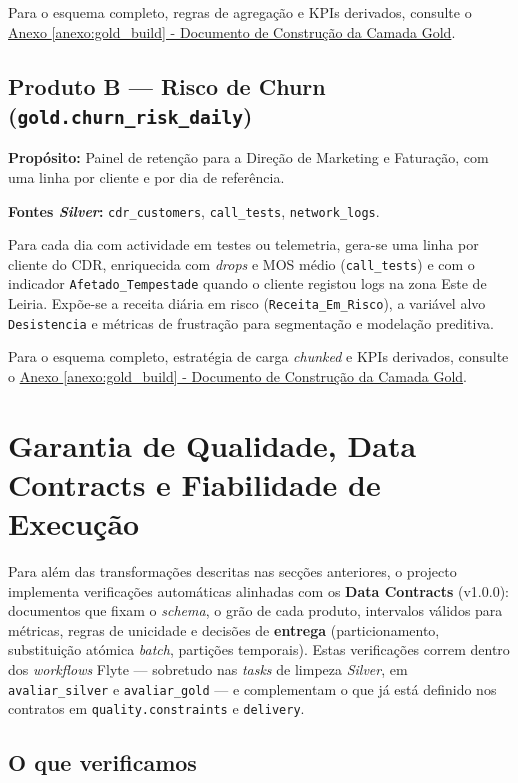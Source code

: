 \documentclass[runningheads]{llncs}
\begin{document}
Para o esquema completo, regras de agregação e KPIs derivados, consulte o \hyperref[anexo:gold_build]{Anexo \ref*{anexo:gold_build} - Documento de Construção da Camada Gold}.


\subsection{Produto B --- Risco de Churn (\texttt{gold.churn\_risk\_daily})}

\textbf{Propósito:} Painel de retenção para a Direção de Marketing e Faturação, com uma linha por cliente e por dia de referência.

\textbf{Fontes \textit{Silver}:} \texttt{cdr\_customers}, \texttt{call\_tests}, \texttt{network\_logs}.

Para cada dia com actividade em testes ou telemetria, gera-se uma linha por cliente do CDR, enriquecida com \textit{drops} e MOS médio (\texttt{call\_tests}) e com o indicador \texttt{Afetado\_Tempestade} quando o cliente registou logs na zona Este de Leiria. Expõe-se a receita diária em risco (\texttt{Receita\_Em\_Risco}), a variável alvo \texttt{Desistencia} e métricas de frustração para segmentação e modelação preditiva.

Para o esquema completo, estratégia de carga \textit{chunked} e KPIs derivados, consulte o \hyperref[anexo:gold_build]{Anexo \ref*{anexo:gold_build} - Documento de Construção da Camada Gold}.


\section{Garantia de Qualidade, Data Contracts e Fiabilidade de Execução}
\label{sec:qa}

Para além das transformações descritas nas secções anteriores, o projecto implementa verificações automáticas alinhadas com os \textbf{Data Contracts} (v1.0.0): documentos que fixam o \textit{schema}, o grão de cada produto, intervalos válidos para métricas, regras de unicidade e decisões de \textbf{entrega} (particionamento, substituição atómica \textit{batch}, partições temporais). Estas verificações correm dentro dos \textit{workflows} Flyte --- sobretudo nas \textit{tasks} de limpeza \textit{Silver}, em \texttt{avaliar\_silver} e \texttt{avaliar\_gold} --- e complementam o que já está definido nos contratos em \texttt{quality.constraints} e \texttt{delivery}.

\subsection{O que verificamos}
\end{document}
